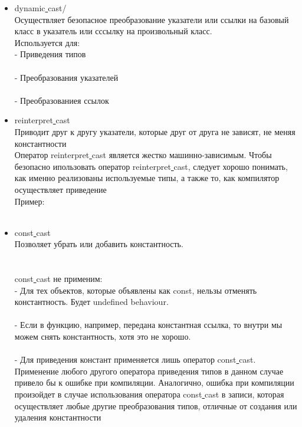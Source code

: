 \documentclass[a4paper,10pt]{article}
\begin{document}
\begin{itemize}
    \item dynamic\underline{ }cast/
    \\Осуществляет безопасное преобразование указатели или ссылки на базовый класс в указатель или сссылку на произвольный класс.
    \\Используется для:
    \\ - Приведения типов
    \\
    \\ - Преобразования указателей
    \\
    \\ - Преобразованиея ссылок
    \\
    \item reinterpret\underline{ }cast
    \\Приводит друг к другу указатели, которые друг от друга не зависят, не меняя константности
\\
Оператор reinterpret\underline{ }cast является жестко машинно-зависимым. Чтобы безопасно ипользовать оператор reinterpret\underline{ }cast, следует хорошо понимать, как именно реализованы используемые типы, а также то, как компилятор осуществляет приведение
\\ 

Пример:
\\
\\
\item const\underline{ }cast
\\Позволяет убрать или добавить константность.
\\
\\
\\const\underline{ }cast не применим:
\\ - Для тех объектов, которые объявлены как const, нельзы отменять константность. Будет undefined behaviour.
\\

\\ - Если в функцию, например, передана константная ссылка, то внутри мы можем снять константность, хотя это не хорошо.
\\

\\ - Для приведения констант применяется лишь оператор const\underline{ }cast. Применение любого другого оператора приведения типов в данном случае привело бы к ошибке при компиляции. Аналогично, ошибка при компиляции произойдет в случае использования оператора const\underline{ }cast в записи, которая осуществляет любые другие преобразования типов, отличные от создания или удаления константности


\end{itemize}
\\
\end{document}

